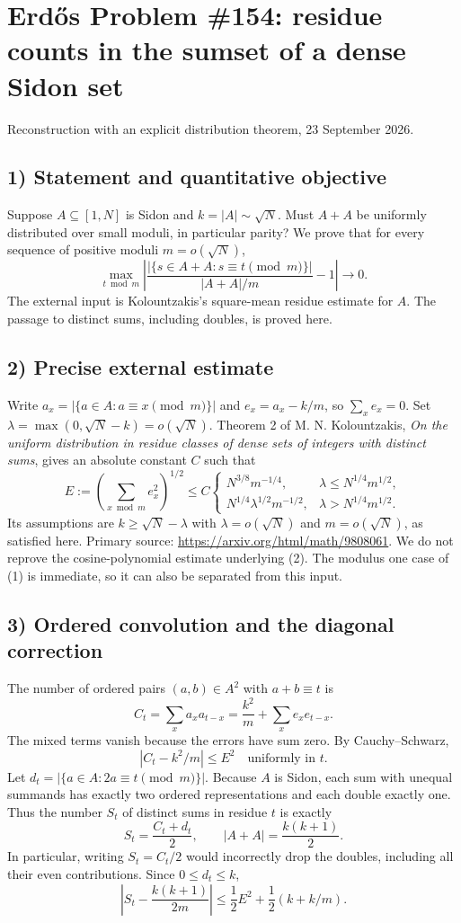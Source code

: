 \section{Erd\H{o}s Problem \#154: residue counts in the sumset of a dense Sidon set}
\noindent Reconstruction with an explicit distribution theorem, 23 September 2026.

\subsection*{1) Statement and quantitative objective}
Suppose $A\subseteq[1,N]$ is Sidon and $k=|A|\sim\sqrt N$. Must $A+A$ be uniformly distributed over small moduli, in particular parity? We prove that for every sequence of positive moduli $m=o(\sqrt N)$,
\[
 \max_{t\bmod m}\left|
 \frac{|\{s\in A+A:s\equiv t\pmod m\}|}{|A+A|/m}-1
 \right|\longrightarrow0.\tag{1}
\]
The external input is Kolountzakis's square-mean residue estimate for $A$. The passage to distinct sums, including doubles, is proved here.

\subsection*{2) Precise external estimate}
Write $a_x=|\{a\in A:a\equiv x\pmod m\}|$ and $e_x=a_x-k/m$, so $\sum_x e_x=0$. Set $\lambda=\max(0,\sqrt N-k)=o(\sqrt N)$. Theorem 2 of M. N. Kolountzakis, \emph{On the uniform distribution in residue classes of dense sets of integers with distinct sums}, gives an absolute constant $C$ such that
\[
 E:=\left(\sum_{x\bmod m}e_x^2\right)^{1/2}
 \le C\begin{cases}
 N^{3/8}m^{-1/4},&\lambda\le N^{1/4}m^{1/2},\\
 N^{1/4}\lambda^{1/2}m^{-1/2},&\lambda>N^{1/4}m^{1/2}.
 \end{cases}\tag{2}
\]
Its assumptions are $k\ge\sqrt N-\lambda$ with $\lambda=o(\sqrt N)$ and $m=o(\sqrt N)$, as satisfied here. Primary source: \url{https://arxiv.org/html/math/9808061}. We do not reprove the cosine-polynomial estimate underlying (2). The modulus one case of (1) is immediate, so it can also be separated from this input.

\subsection*{3) Ordered convolution and the diagonal correction}
The number of ordered pairs $(a,b)\in A^2$ with $a+b\equiv t$ is
\[
 C_t=\sum_xa_xa_{t-x}=\frac{k^2}{m}+\sum_xe_xe_{t-x}.
\]
The mixed terms vanish because the errors have sum zero. By Cauchy--Schwarz,
\[
 |C_t-k^2/m|\le E^2\quad\text{uniformly in }t.\tag{3}
\]
Let $d_t=|\{a\in A:2a\equiv t\pmod m\}|$. Because $A$ is Sidon, each sum with unequal summands has exactly two ordered representations and each double exactly one. Thus the number $S_t$ of distinct sums in residue $t$ is exactly
\[
 S_t=\frac{C_t+d_t}{2},\qquad |A+A|=\frac{k(k+1)}2.
\]
In particular, writing $S_t=C_t/2$ would incorrectly drop the doubles, including all their even contributions. Since $0\le d_t\le k$,
\[
 \left|S_t-\frac{k(k+1)}{2m}\right|
 \le\frac12E^2+\frac12(k+k/m).\tag{4}
\]

